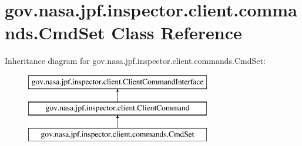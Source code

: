 \hypertarget{classgov_1_1nasa_1_1jpf_1_1inspector_1_1client_1_1commands_1_1_cmd_set}{}\section{gov.\+nasa.\+jpf.\+inspector.\+client.\+commands.\+Cmd\+Set Class Reference}
\label{classgov_1_1nasa_1_1jpf_1_1inspector_1_1client_1_1commands_1_1_cmd_set}
Inheritance diagram for gov.\+nasa.\+jpf.\+inspector.\+client.\+commands.\+Cmd\+Set\+:\begin{figure}[H]
\begin{center}
\leavevmode
\includegraphics[height=3.000000cm]{classgov_1_1nasa_1_1jpf_1_1inspector_1_1client_1_1commands_1_1_cmd_set}
\end{center}
\end{figure}
